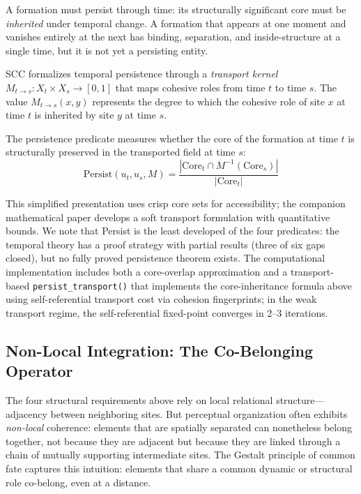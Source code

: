 \documentclass[lettersize,journal]{IEEEtran}
\begin{document}
A formation must persist through time: its structurally significant core must be \emph{inherited} under temporal change. A formation that appears at one moment and vanishes entirely at the next has binding, separation, and inside-structure at a single time, but it is not yet a persisting entity.

SCC formalizes temporal persistence through a \emph{transport kernel} $M_{t \to s} : X_t \times X_s \to [0,1]$ that maps cohesive roles from time $t$ to time $s$. The value $M_{t \to s}(x,y)$ represents the degree to which the cohesive role of site $x$ at time $t$ is inherited by site $y$ at time $s$.

The persistence predicate measures whether the core of the formation at time $t$ is structurally preserved in the transported field at time $s$:
\begin{equation}
\text{Persist}(u_t, u_s, M) = \frac{|\mathrm{Core}_t \cap M^{-1}(\mathrm{Core}_s)|}{|\mathrm{Core}_t|}
\end{equation}

This simplified presentation uses crisp core sets for accessibility; the companion mathematical paper develops a soft transport formulation with quantitative bounds. We note that Persist is the least developed of the four predicates: the temporal theory has a proof strategy with partial results (three of six gaps closed), but no fully proved persistence theorem exists. The computational implementation includes both a core-overlap approximation and a transport-based \texttt{persist\_transport()} that implements the core-inheritance formula above using self-referential transport cost via cohesion fingerprints; in the weak transport regime, the self-referential fixed-point converges in 2--3 iterations.

\subsection{Non-Local Integration: The Co-Belonging Operator}
\label{sec:cobelonging}

The four structural requirements above rely on local relational structure---adjacency between neighboring sites. But perceptual organization often exhibits \emph{non-local} coherence: elements that are spatially separated can nonetheless belong together, not because they are adjacent but because they are linked through a chain of mutually supporting intermediate sites. The Gestalt principle of common fate captures this intuition: elements that share a common dynamic or structural role co-belong, even at a distance.
\end{document}
